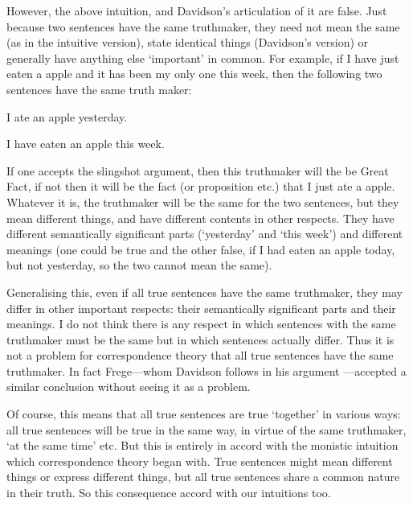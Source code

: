 However, the above intuition, and Davidson's articulation of it are false.
Just because two sentences have the same truthmaker, they need not mean the same (as in the intuitive version), state identical things (Davidson's version) or generally have anything else `important' in common.
For example, if I have just eaten a apple and it has been my only one this week, then the following two sentences have the same truth maker:

	\begin{example} \label{yesterday}
	I ate an apple yesterday.
	\end{example}

	\begin{example} \label{week}
	I have eaten an apple this week.
	\end{example}

If one accepts the slingshot argument, then this truthmaker will the be Great Fact, if not then it will be the fact (or proposition etc.) that I just ate a apple.
Whatever it is, the truthmaker will be the same for the two sentences, but they mean different things, and have different contents in other respects.
They have different semantically significant parts (`yesterday' and `this week') and different meanings (one could be true and the other false, if I had eaten an apple today, but not yesterday, so the two cannot mean the same).

Generalising this, even if all true sentences have the same truthmaker, they may differ in other important respects: their semantically significant parts and their meanings.
I do not think there is any respect in which sentences with the same truthmaker must be the same but in which sentences actually differ.
Thus it is not a problem for correspondence theory that all true sentences have the same truthmaker.
In fact Frege---whom Davidson follows in his argument \parencite[750]{Davidson_1969}---accepted a similar conclusion without seeing it as a problem.
\parencite[216]{Frege_1948}

Of course, this means that all true sentences are true `together' in various ways: all true sentences will be true in the same way, in virtue of the same truthmaker, `at the same time' etc.
But this is entirely in accord with the monistic intuition which correspondence theory began with.
True sentences might mean different things or express different things, but all true sentences share a common nature in their truth.
So this consequence accord with our intuitions too.
